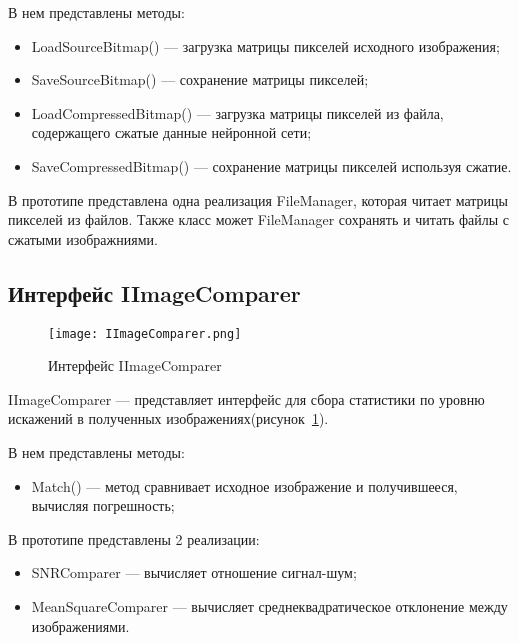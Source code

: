 В нем представлены методы:
\begin{itemize}
  \item LoadSourceBitmap() --- загрузка матрицы пикселей исходного изображения;
  \item SaveSourceBitmap() --- сохранение матрицы пикселей;
  \item LoadCompressedBitmap() --- загрузка матрицы пикселей из файла, содержащего сжатые данные нейронной сети;
  \item SaveCompressedBitmap() --- сохранение матрицы пикселей используя сжатие.
\end{itemize}

В прототипе представлена одна реализация FileManager, которая читает матрицы пикселей из файлов.
Также класс может FileManager сохранять и читать файлы с сжатыми изображниями.

\subsection{Интерфейс IImageComparer}
\label{subsub:development:iimagecomparer}

\begin{figure}[ht]
\centering
  \texttt{[image: IImageComparer.png]}
  \caption{ Интерфейс IImageComparer }
  \label{fig:iimagecomparer}
\end{figure}
IImageComparer --- представляет интерфейс для сбора статистики по уровню искажений в полученных изображениях(рисунок~\ref{fig:iimagecomparer}).

В нем представлены методы:
\begin{itemize}
  \item Match() --- метод сравнивает исходное изображение и получившееся, вычисляя погрешность;
\end{itemize}

В прототипе представлены 2 реализации:
\begin{itemize}
  \item SNRComparer --- вычисляет отношение сигнал-шум;
  \item MeanSquareComparer --- вычисляет среднеквадратическое отклонение между изображениями.
\end{itemize}
